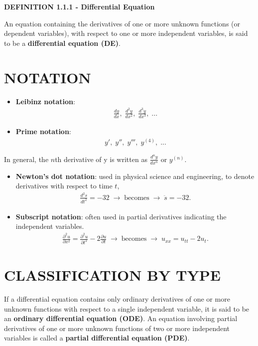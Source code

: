 \documentclass[12pt]{report}
\begin{document}
	\par \textbf{DEFINITION 1.1.1 - Differential Equation}

	\par An equation containing the derivatives of one or more unknown functions (or dependent variables), with respect to one or more independent variables, is said to be a \textbf{differential equation (DE)}.

		\section{NOTATION}

		\begin{itemize}
			\item \textbf{Leibinz notation}:
			\begin{align*}
				\frac{dy}{dx}, \; \frac{d^{2}y}{dx^{2}}, \; \frac{d^{3}y}{dx^{3}}, \; ...
			\end{align*}
			\item \textbf{Prime notation}:
			\begin{align*}
				y', \; y'', \; y''', \; y^{(4)}, \; ...
			\end{align*}
		\end{itemize}
		In general, the $n$th derivative of y is written as $\frac{d^{n}y}{dx^{n}}$ or $y^{(n)}$.
		\begin{itemize}
			\item \textbf{Newton's dot notation}: used in physical science and engineering, to denote derivatives with respect to time $t$,
			\begin{align*}
				\frac{d^{2}s}{dt^{2}} = -32 \; \rightarrow \; \text{becomes} \; \rightarrow \; \ddot{s} = -32.
			\end{align*}
			\item \textbf{Subscript notation}: often used in partial derivatives indicating the independent variables.
			\begin{align*}
				\frac{\partial^{2} u}{\partial x^{2}} = \frac{\partial^{2} u}{\partial t^{2}} - 2 \frac{\partial u}{\partial t}\; \rightarrow \; \text{becomes} \; \rightarrow \; u_{xx} = u_{tt} - 2 u_{t}.
			\end{align*}
		\end{itemize}

		\section{CLASSIFICATION BY TYPE}

		\par If a differential equation contains only ordinary derivatives of one or more unknown functions with respect to a single independent variable, it is said to be an \textbf{ordinary differential equation (ODE)}. An equation involving partial derivatives of one or more unknown functions of two or more independent variables is called a \textbf{partial differential equation (PDE)}.
\end{document}
